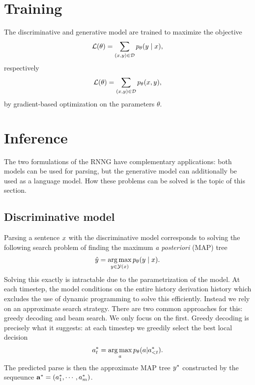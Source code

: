 \section{Training}
The discriminative and generative model are trained to maximize the objective
\begin{align*}
  \mathcal{L}(\theta) = \sum_{(x, y) \in \mathcal{D}} p_{\theta} (y \mid x),
\end{align*}
respectively
\begin{align*}
  \mathcal{L}(\theta) = \sum_{(x, y) \in \mathcal{D}} p_{\theta} (x, y),
\end{align*}
by gradient-based optimization on the parameters $\theta$.

\section{Inference}
The two formulations of the RNNG have complementary applications: both models can be used for parsing, but the generative model can additionally be used as a language model. How these problems can be solved is the topic of this section.

\subsection{Discriminative model}
Parsing a sentence $x$ with the discriminative model corresponds to solving the following search problem of finding the maximum \textit{a posteriori} (MAP) tree
\begin{align*}
  \hat{y} = \operatorname*{arg\,max}_{ y \in \mathcal{Y}(x) } p_{\theta}(y \mid x).
\end{align*}
Solving this exactly is intractable due to the parametrization of the model. At each timestep, the model conditions on the entire history derivation history which excludes the use of dynamic programming to solve this efficiently. Instead we rely on an approximate search strategy. There are two common approaches for this: greedy decoding and beam search. We only focus on the first. Greedy decoding is precisely what it suggests: at each timestep we greedily select the best local decision
\begin{align*}
  a^{*}_t = \operatorname*{arg\,max}_{a} p_{\theta}(a|a^{*}_{< t}).
\end{align*}
The predicted parse is then the approximate MAP tree $y^*$ constructed by the sequeunce $\mathbf{a}^* = (a^{*}_1, \cdots, a^{*}_m)$.

